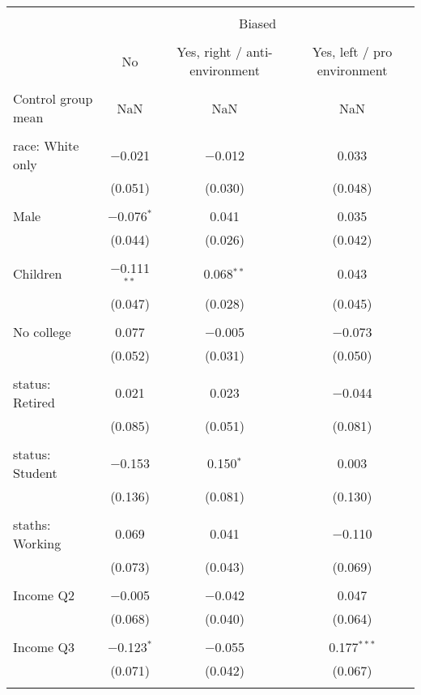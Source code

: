 
\begin{tabular}{@{\extracolsep{5pt}}lccc} 
\\[-1.8ex]\hline 
\hline \\[-1.8ex] 
 & \multicolumn{3}{c}{Biased} \\ 
\cline{2-4} 
\\[-1.8ex] & No & Yes, right / anti-environment & Yes, left / pro environment \\ 
\hline \\[-1.8ex] 
 Control group mean & NaN & NaN & NaN  \\ \hline \\[-1.8ex] race: White only & $-$0.021 & $-$0.012 & 0.033 \\ 
  & (0.051) & (0.030) & (0.048) \\ 
  & & & \\ 
 Male & $-$0.076$^{*}$ & 0.041 & 0.035 \\ 
  & (0.044) & (0.026) & (0.042) \\ 
  & & & \\ 
 Children & $-$0.111$^{**}$ & 0.068$^{**}$ & 0.043 \\ 
  & (0.047) & (0.028) & (0.045) \\ 
  & & & \\ 
 No college & 0.077 & $-$0.005 & $-$0.073 \\ 
  & (0.052) & (0.031) & (0.050) \\ 
  & & & \\ 
 status: Retired & 0.021 & 0.023 & $-$0.044 \\ 
  & (0.085) & (0.051) & (0.081) \\ 
  & & & \\ 
 status: Student & $-$0.153 & 0.150$^{*}$ & 0.003 \\ 
  & (0.136) & (0.081) & (0.130) \\ 
  & & & \\ 
 staths: Working & 0.069 & 0.041 & $-$0.110 \\ 
  & (0.073) & (0.043) & (0.069) \\ 
  & & & \\ 
 Income Q2 & $-$0.005 & $-$0.042 & 0.047 \\ 
  & (0.068) & (0.040) & (0.064) \\ 
  & & & \\ 
 Income Q3 & $-$0.123$^{*}$ & $-$0.055 & 0.177$^{***}$ \\ 
  & (0.071) & (0.042) & (0.067) \\ 
  & & & \\ 

\end{tabular}
